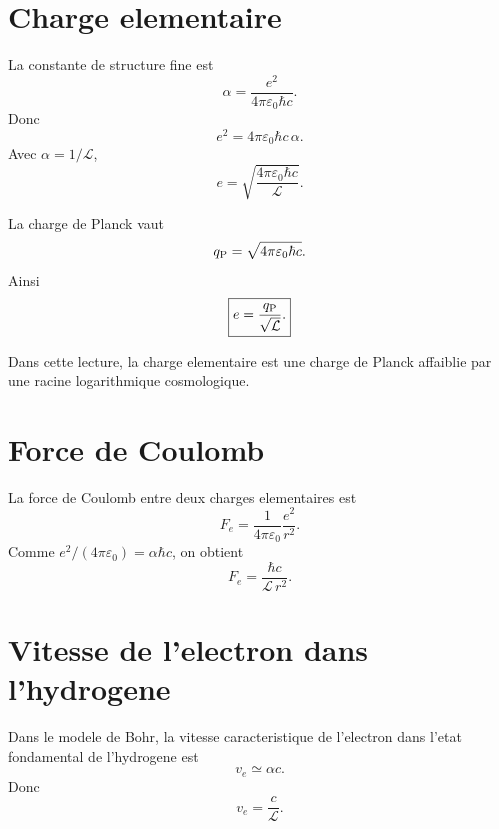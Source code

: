 \documentclass[11pt,a4paper]{article}
\newcommand{\cL}{\mathcal L}
\newcommand{\epsz}{\varepsilon_0}
\begin{document}
\section{Charge elementaire}

La constante de structure fine est
\begin{equation}
\alpha=\frac{e^2}{4\pi\epsz\hbar c}.
\end{equation}
Donc
\begin{equation}
e^2=4\pi\epsz\hbar c\,\alpha.
\end{equation}
Avec \(\alpha=1/\cL\),
\begin{equation}
\boxed{
e=\sqrt{\frac{4\pi\epsz\hbar c}{\cL}}.
}
\end{equation}

La charge de Planck vaut
\begin{equation}
q_{\rm P}=\sqrt{4\pi\epsz\hbar c}.
\end{equation}
Ainsi
\begin{equation}
\boxed{
e=\frac{q_{\rm P}}{\sqrt{\cL}}.
}
\end{equation}

Dans cette lecture, la charge elementaire est une charge de Planck affaiblie
par une racine logarithmique cosmologique.

\section{Force de Coulomb}

La force de Coulomb entre deux charges elementaires est
\begin{equation}
F_e=\frac{1}{4\pi\epsz}\frac{e^2}{r^2}.
\end{equation}
Comme \(e^2/(4\pi\epsz)=\alpha\hbar c\), on obtient
\begin{equation}
\boxed{
F_e=\frac{\hbar c}{\cL\,r^2}.
}
\end{equation}

\section{Vitesse de l'electron dans l'hydrogene}

Dans le modele de Bohr, la vitesse caracteristique de l'electron dans l'etat
fondamental de l'hydrogene est
\begin{equation}
v_e\simeq \alpha c.
\end{equation}
Donc
\begin{equation}
\boxed{
v_e=\frac{c}{\cL}.
}
\end{equation}
\end{document}
